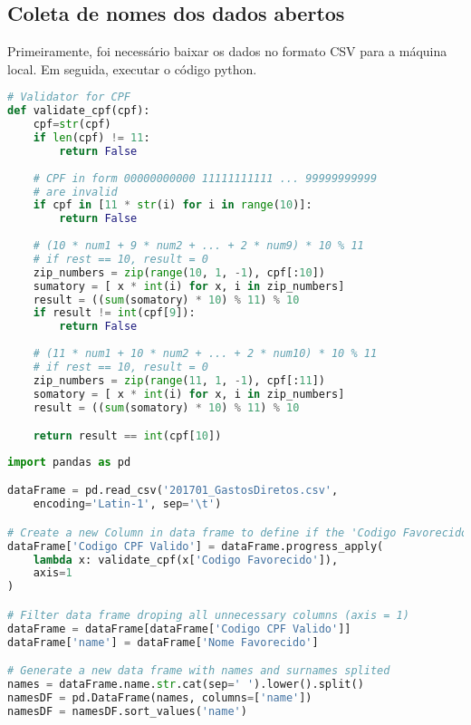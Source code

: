 \begin{apendicesenv}

\partapendices
\chapter{Coleta de nomes dos dados abertos}
\label{sec:apendiceA}

Primeiramente, foi necessário baixar os dados no formato CSV para a máquina local. Em seguida, executar o código python.

\begin{lstlisting}[language=Python]
# Validator for CPF
def validate_cpf(cpf):
    cpf=str(cpf)
    if len(cpf) != 11:
        return False
    
    # CPF in form 00000000000 11111111111 ... 99999999999 
    # are invalid
    if cpf in [11 * str(i) for i in range(10)]:
        return False    
        
    # (10 * num1 + 9 * num2 + ... + 2 * num9) * 10 % 11
    # if rest == 10, result = 0
    zip_numbers = zip(range(10, 1, -1), cpf[:10])
    sumatory = [ x * int(i) for x, i in zip_numbers]
    result = ((sum(somatory) * 10) % 11) % 10
    if result != int(cpf[9]):
        return False
    
    # (11 * num1 + 10 * num2 + ... + 2 * num10) * 10 % 11
    # if rest == 10, result = 0
    zip_numbers = zip(range(11, 1, -1), cpf[:11])
    somatory = [ x * int(i) for x, i in zip_numbers]
    result = ((sum(somatory) * 10) % 11) % 10

    return result == int(cpf[10])
\end{lstlisting}

\begin{lstlisting}[language=Python]
import pandas as pd

dataFrame = pd.read_csv('201701_GastosDiretos.csv', 
	encoding='Latin-1', sep='\t')

# Create a new Column in data frame to define if the 'Codigo Favorecido' is a CPF
dataFrame['Codigo CPF Valido'] = dataFrame.progress_apply(
    lambda x: validate_cpf(x['Codigo Favorecido']),
    axis=1
)

# Filter data frame droping all unnecessary columns (axis = 1)
dataFrame = dataFrame[dataFrame['Codigo CPF Valido']]
dataFrame['name'] = dataFrame['Nome Favorecido']

# Generate a new data frame with names and surnames splited
names = dataFrame.name.str.cat(sep=' ').lower().split()
namesDF = pd.DataFrame(names, columns=['name'])
namesDF = namesDF.sort_values('name')


\end{lstlisting}
\end{apendicesenv}

